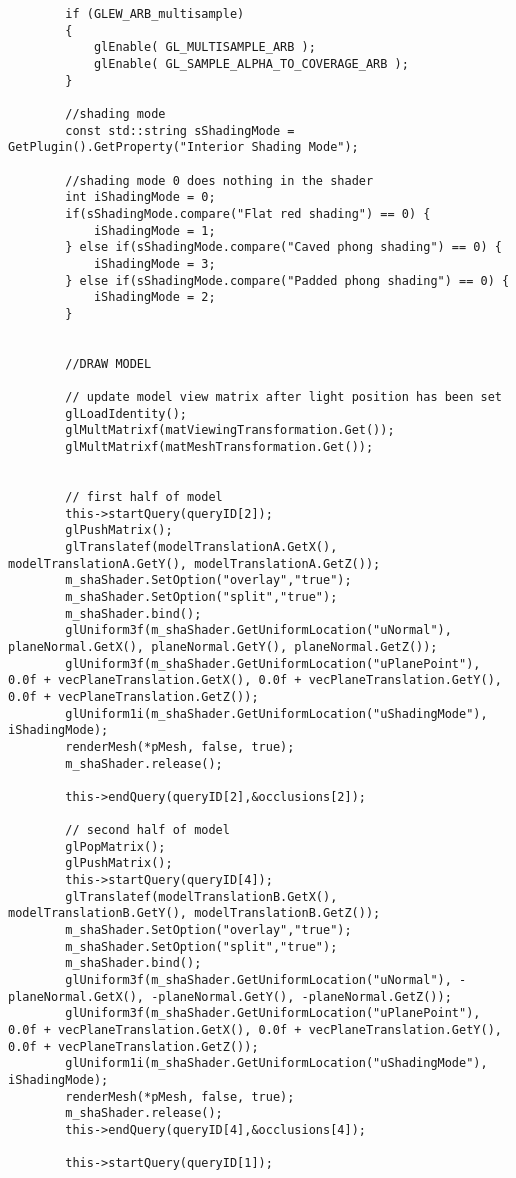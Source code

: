 \begin{verbatim}
		if (GLEW_ARB_multisample)
		{
			glEnable( GL_MULTISAMPLE_ARB );
			glEnable( GL_SAMPLE_ALPHA_TO_COVERAGE_ARB );
		}

		//shading mode
		const std::string sShadingMode = GetPlugin().GetProperty("Interior Shading Mode");

		//shading mode 0 does nothing in the shader
		int iShadingMode = 0;
		if(sShadingMode.compare("Flat red shading") == 0) {
			iShadingMode = 1;
		} else if(sShadingMode.compare("Caved phong shading") == 0) {
			iShadingMode = 3;
		} else if(sShadingMode.compare("Padded phong shading") == 0) {
			iShadingMode = 2;
		}


		//DRAW MODEL

		// update model view matrix after light position has been set
		glLoadIdentity();
		glMultMatrixf(matViewingTransformation.Get());
		glMultMatrixf(matMeshTransformation.Get());


		// first half of model
		this->startQuery(queryID[2]);
		glPushMatrix();
		glTranslatef(modelTranslationA.GetX(), modelTranslationA.GetY(), modelTranslationA.GetZ());
		m_shaShader.SetOption("overlay","true");
		m_shaShader.SetOption("split","true");
		m_shaShader.bind();
		glUniform3f(m_shaShader.GetUniformLocation("uNormal"), planeNormal.GetX(), planeNormal.GetY(), planeNormal.GetZ());
		glUniform3f(m_shaShader.GetUniformLocation("uPlanePoint"), 0.0f + vecPlaneTranslation.GetX(), 0.0f + vecPlaneTranslation.GetY(), 0.0f + vecPlaneTranslation.GetZ());
		glUniform1i(m_shaShader.GetUniformLocation("uShadingMode"), iShadingMode);
		renderMesh(*pMesh, false, true);
		m_shaShader.release();

		this->endQuery(queryID[2],&occlusions[2]);

		// second half of model
		glPopMatrix();
		glPushMatrix();
		this->startQuery(queryID[4]);
		glTranslatef(modelTranslationB.GetX(), modelTranslationB.GetY(), modelTranslationB.GetZ());
		m_shaShader.SetOption("overlay","true");
		m_shaShader.SetOption("split","true");
		m_shaShader.bind();
		glUniform3f(m_shaShader.GetUniformLocation("uNormal"), -planeNormal.GetX(), -planeNormal.GetY(), -planeNormal.GetZ());
		glUniform3f(m_shaShader.GetUniformLocation("uPlanePoint"), 0.0f + vecPlaneTranslation.GetX(), 0.0f + vecPlaneTranslation.GetY(), 0.0f + vecPlaneTranslation.GetZ());
		glUniform1i(m_shaShader.GetUniformLocation("uShadingMode"), iShadingMode);
		renderMesh(*pMesh, false, true);
		m_shaShader.release();
		this->endQuery(queryID[4],&occlusions[4]);

		this->startQuery(queryID[1]);


\end{verbatim}
